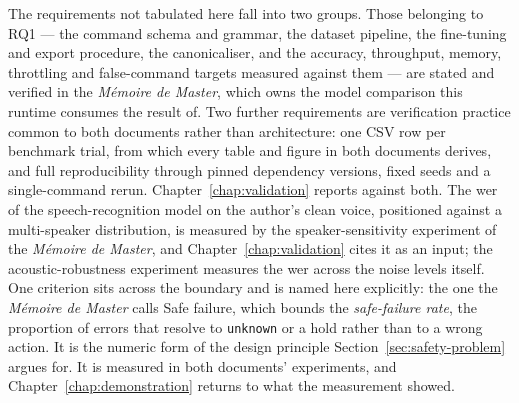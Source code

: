 The requirements not tabulated here fall into two groups. Those belonging to RQ1 --- the command
schema and grammar, the dataset pipeline, the fine-tuning and export procedure, the canonicaliser,
and the accuracy, throughput, memory, throttling and false-command targets measured against them
--- are stated and verified in the \emph{M\'emoire de Master}, which owns the model comparison this
runtime consumes the result of. Two further requirements are verification practice common to both
documents rather than architecture: one CSV row per benchmark trial, from which every table and
figure in both documents derives, and full reproducibility through pinned dependency versions,
fixed seeds and a single-command rerun. Chapter~\ref{chap:validation} reports against both. The
\gls{wer} of the speech-recognition model on the author's clean voice, positioned against a
multi-speaker distribution, is measured by the speaker-sensitivity experiment of the \emph{M\'emoire
de Master}, and Chapter~\ref{chap:validation} cites it as an input; the acoustic-robustness
experiment measures the \gls{wer} across the noise levels itself. One criterion sits
across the boundary and is named here explicitly: the one the \emph{M\'emoire de Master} calls
Safe failure, which bounds the \emph{safe-failure rate}, the proportion of errors that resolve to
\texttt{unknown} or a hold rather than to a wrong action. It is the numeric form of the design
principle Section~\ref{sec:safety-problem} argues for. It is measured in both documents'
experiments, and Chapter~\ref{chap:demonstration} returns to what the measurement showed.

